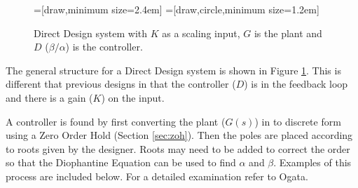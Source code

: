\documentclass{article}
\begin{document}
\begin{figure}[h!]

\begin{center}
=[draw,minimum size=2.4em]
=[draw,circle,minimum size=1.2em]
\end{center}

\caption{Direct Design system with $K$ as a scaling input, $G$ is
the plant and $D$ (${\beta}/{\alpha}$) is the controller.}
\label{fig:dd}
\end{figure}

The general structure for a Direct Design system is shown in
Figure \ref{fig:dd}.
This is different that previous designs in that the controller ($D$)
is in the feedback loop and there is a gain ($K$) on the input.

A controller is found by first converting the plant ($G(s)$) in to discrete
form using a Zero Order Hold (Section \ref{sec:zoh}).
Then the poles are placed according to roots given by the designer.
Roots may need to be added to correct the order so that the Diophantine
Equation can be used to find $\alpha$ and $\beta$.
Examples of this process are included below.
For a detailed examination refer to Ogata\autocite[Pg. 517]{ogata1995discrete}.
\end{document}
